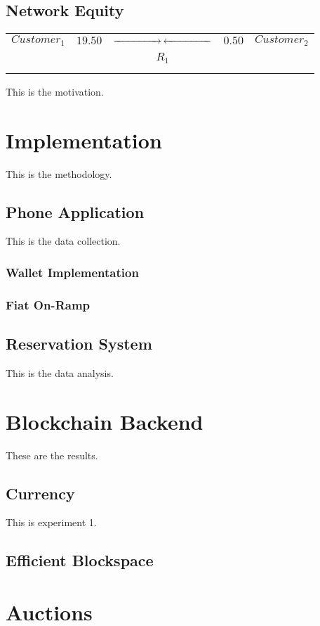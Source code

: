 \documentclass{article}
\begin{document}
	\subsection{Network Equity}
		\begin{tabular}{l c c c r}
			$Customer_{1}$ & 
			$19.50$ & 
			$\xrightarrow{\hspace*{1.5cm}}\,\xleftarrow{\hspace*{1.5cm}}$ & 
			$0.50$ & 
			$Customer_{2}$ \\
			& & $\begin{array}{c}
				R_{1} \\
			\end{array}$ & & \\
		\end{tabular}
	This is the motivation.
	
	\section{Implementation}
	
	This is the methodology.
	
	\subsection{Phone Application}
	
	This is the data collection.
	
	\subsubsection{Wallet Implementation}
	
	\subsubsection{Fiat On-Ramp}
	
	\subsection{Reservation System}
	
	This is the data analysis.
	
	\section{Blockchain Backend}
	
	These are the results.
	
	\subsection{Currency}
	
	This is experiment 1.
	
	\subsection{Efficient Blockspace}
	
	\section{Auctions}
	
\end{document}
